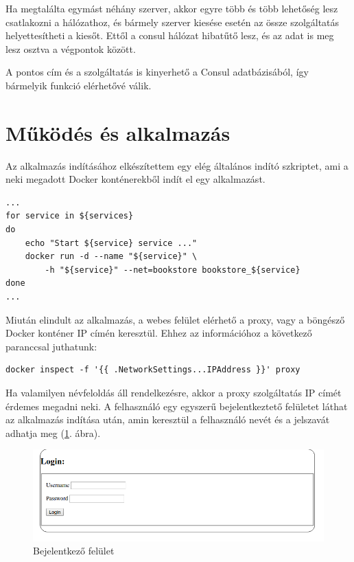 \documentclass[11pt,magyar,a4paper,twoside,]{report}
\let\Oldincludegraphics\includegraphics
\renewcommand{\includegraphics}[1]{
\begin{adjustbox}{max size={\textwidth}{\textheight}}
    \Oldincludegraphics[scale=0.6]{#1}%
\end{adjustbox}
}
\begin{document}
Ha megtalálta egymást néhány szerver, akkor egyre több és több lehetőség
lesz csatlakozni a hálózathoz, és bármely szerver kiesése esetén az
össze szolgáltatás helyettesítheti a kiesőt. Ettől a consul hálózat
hibatűtő lesz, és az adat is meg lesz osztva a végpontok között.

A pontos cím és a szolgáltatás is kinyerhető a Consul adatbázisából, így
bármelyik funkció elérhetővé válik.

\section{Működés és
alkalmazás}\label{mux171kuxf6duxe9s-uxe9s-alkalmazuxe1s}

Az alkalmazás indításához elkészítettem egy elég általános indító
szkriptet, ami a neki megadott Docker konténerekből indít el egy
alkalmazást.

\begin{verbatim}
...
for service in ${services}
do
    echo "Start ${service} service ..."
    docker run -d --name "${service}" \
        -h "${service}" --net=bookstore bookstore_${service}
done
...
\end{verbatim}

Miután elindult az alkalmazás, a webes felület elérhető a proxy, vagy a
böngésző Docker konténer IP címén keresztül. Ehhez az információhoz a
következő paranccsal juthatunk:

\begin{verbatim}
docker inspect -f '{{ .NetworkSettings...IPAddress }}' proxy
\end{verbatim}

Ha valamilyen névfeloldás áll rendelkezésre, akkor a proxy szolgáltatás
IP címét érdemes megadni neki. A felhasználó egy egyszerű
bejelentkeztető felületet láthat az alkalmazás indítása után, amin
keresztül a felhasználó nevét és a jelszavát adhatja meg (\ref{login}.
ábra).

\begin{figure}[H]
\centering
\includegraphics{img/loginscreen.png}
\caption{Bejelentkező felület\label{login}}
\end{figure}
\end{document}
